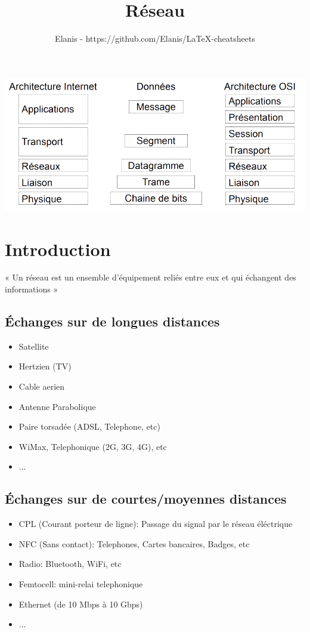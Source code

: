 \documentclass[a4paper, 12pt, french]{article}
\title{Réseau}
\author{Elanis - https://github.com/Elanis/LaTeX-cheatsheets}
\date{}
\begin{document}
	\maketitle

	\includegraphics[width=13.8cm]{reseau_modele_osi}

	\section{Introduction}

	« Un réseau est un ensemble d'équipement reliés entre eux et qui échangent des informations »

	\subsection{Échanges sur de longues distances}
	\begin{itemize}
		\item Satellite
		\item Hertzien (TV)
		\item Cable aerien
		\item Antenne Parabolique
		\item Paire torsadée (ADSL, Telephone, etc)
		\item WiMax, Telephonique (2G, 3G, 4G), etc
		\item ...
	\end{itemize}

	\subsection{Échanges sur de courtes/moyennes distances}
	\begin{itemize}
		\item CPL (Courant porteur de ligne): Passage du signal par le réseau éléctrique
		\item NFC (Sans contact): Telephones, Cartes bancaires, Badges, etc
		\item Radio: Bluetooth, WiFi, etc
		\item Femtocell: mini-relai telephonique
		\item Ethernet (de 10 Mbps à 10 Gbps)
		\item ...
	\end{itemize}
	
\end{document}
